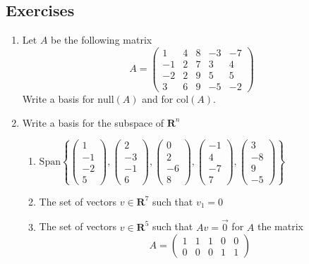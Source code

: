 \documentclass[12pt]{article}
\numberwithin{equation}{subsection}
\numberwithin{figure}{subsection}
\theoremstyle{note}
\newcommand\Span[1]{\mathrm{Span}\left\{#1\right\}}
\newcommand\nul[1]{\mathrm{null}(#1)}
\newcommand\col[1]{\mathrm{col}(#1)}
\begin{document}
\subsection{Exercises}
\begin{enumerate}[label=\arabic*.]
	\item Let $A$ be the following matrix \[ A=\begin{pmatrix} 1 & 4 & 8 & -3 & -7 \\ -1 & 2 & 7 & 3 & 4\\ -2 & 2 & 9 & 5 & 5 \\ 3 & 6 & 9 & -5 & -2\end{pmatrix}\] 
	Write a basis for $\nul{A}$ and for $\col{A}$. 
	
	\item Write a basis for the subspace of $\mathbf{R}^n$ 
	\begin{enumerate}
		\item  $\Span{ \begin{pmatrix} 1 \\ -1 \\ -2 \\ 5\end{pmatrix}, \begin{pmatrix} 2 \\ -3 \\ -1 \\ 6 \end{pmatrix}, \begin{pmatrix} 0 \\ 2 \\ -6 \\ 8 \end{pmatrix}, \begin{pmatrix} -1 \\ 4 \\ -7 \\ 7 \end{pmatrix}, \begin{pmatrix} 3\\ -8 \\ 9 \\ -5 \end{pmatrix}}$
		\item The set of vectors $v\in \mathbf{R}^7$ such that $v_1=0$
		\item The set of vectors $v\in \mathbf{R}^5$ such that $Av=\vec{0}$ for $A$ the matrix \[ A=\begin{pmatrix} 1 & 1 & 1 & 0 & 0 \\ 0 & 0 & 0 & 1 & 1\end{pmatrix}\]

\end{enumerate}
\end{enumerate}
\end{document}
